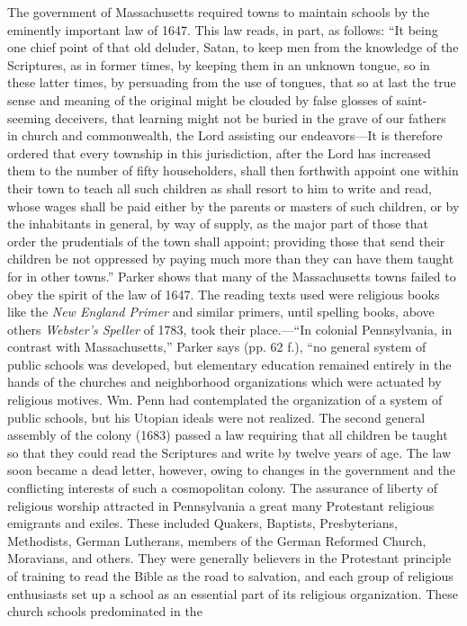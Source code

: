 The government of Massachusetts required towns to maintain schools by the eminently important law of 1647. This law reads, in part, as follows: “It being one chief point of that old deluder, Satan, to keep men from the knowledge of the Scriptures, as in former times, by keeping them in an unknown tongue, so in these latter times, by persuading from the use of tongues, that so at last the true sense and meaning of the original might be clouded by false glosses of saint-seeming deceivers, that learning might not be buried in the grave of our fathers in church and commonwealth, the Lord assisting our endeavors—It is therefore ordered that every township in this jurisdiction, after the Lord has increased them to the number of fifty householders, shall then forthwith appoint one within their town to teach all such children as shall resort to him to write and read, whose wages shall be paid either by the parents or masters of such children, or by the inhabitants in general, by way of supply, as the major part of those that order the prudentials of the town shall appoint; providing those that send their children be not oppressed by paying much more than they can have them taught for in other towns.” Parker shows that many of the Massachusetts towns failed to obey the spirit of the law of 1647. The reading texts used were religious books like the \emph{New England Primer} and similar primers, until spelling books, above others \emph{Webster’s Speller} of 1783, took their place.—“In colonial Pennsylvania, in contrast with Massachusetts,” Parker says (pp. 62 f.), “no general system of public schools was developed, but elementary education remained entirely in the hands of the churches and neighborhood organizations which were actuated by religious motives. Wm. Penn had contemplated the organization of a system of public schools, but his Utopian ideals were not realized. The second general assembly of the colony (1683) passed a law requiring that all children be taught so that they could read the Scriptures and write by twelve years of age. The law soon became a dead letter, however, owing to changes in the government and the conflicting interests of such a cosmopolitan colony. The assurance of liberty of religious worship attracted in Pennsylvania a great many Protestant religious emigrants and exiles. These included Quakers, Baptists, Presbyterians, Methodists, German Lutherans, members of the German Reformed Church, Moravians, and others. They were generally believers in the Protestant principle of training to read the Bible as the road to salvation, and each group of religious enthusiasts set up a school as an essential part of its religious organization. These church schools predominated in the
